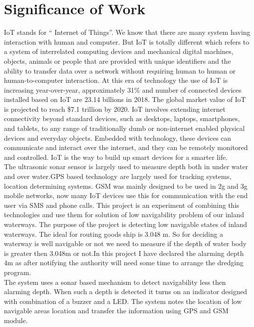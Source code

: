 \documentclass[12pt, top = 1 inch, bottom = 1 inch, left = 1.2 inch, top = .8 inch]{book}
\begin{document}
	\section{Significance of Work}
		IoT stands for “ Internet of Things”. We know that there are many system having interaction with human and computer. But IoT is totally different which refers to a system of interrelated computing devices and mechanical digital machines, objects, animals or people that are provided with unique identifiers and the ability to transfer data over a network without requiring human to human or human-to-computer interaction. 
		At this era of technology the use of IoT is increasing year-over-year, approximately 31\% and number of connected devices installed based on IoT are 23.14 billions in 2018. The global market value of IoT is projected to reach \$7.1 trillion by 2020. IoT involves extending internet connectivity beyond standard devices, such as desktops, laptops, smartphones, and tablets, to any range of traditionally dumb or non-internet enabled physical devices and everyday objects. Embedded with technology, these devices can communicate and interact over the internet, and they can be remotely monitored and controlled. IoT is the way to build up smart devices for a smarter life.\\
		The ultrasonic sonar sensor is largely used to measure depth both in under water and over water.GPS based technology are largely used for tracking systems, location determining systems. GSM was mainly designed to be used in 2g and 3g mobile networks, now many IoT devices use this for communication with the end user via SMS and phone calls. This project is an experiment of combining this technologies and use them for solution of low navigability problem of our inland waterways.   
		The purpose of the project is detecting low navigable states of inland waterways. The ideal for routing goods ship is 3.048 m. So for deciding a waterway is well navigable or not we need to measure if the depth of water body is greater then 3.048m or not.In this project I have declared the alarming depth 4m as after notifying the authority will need some time to arrange the dredging program.\\
		The system uses a sonar based mechanism to detect navigability less then alarming depth. When such a depth is detected it turns on an indicator designed with combination of a buzzer and a LED. The system notes the location of low navigable areas location and transfer the information using GPS and GSM module.\\
\end{document}
